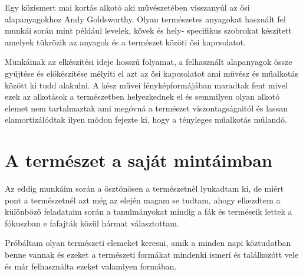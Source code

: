 \documentclass[fontsize=12pt, appendixprefix=true]{scrreprt}
\begin{document}
\vspace{3 mm}
Egy közismert mai kortás alkotó aki művészetében visszanyúl az ősi alapanyagokhoz Andy Goldsworthy. Olyan természetes anyagokat használt fel munkái során mint például levelek, kövek és hely- specifikus szobrokat készített amelyek tükrözik az anyagok és a természet közöti ősi kapcsolatot.

Munkáinak az elkészítési ideje hosszú folyamat, a felhasznált  alapanyagok össze gyűjtése és előkészítése mélyíti el azt az ősi kapcsolatot ami művész és műalkotás között ki tudd alakulni.
A kész művei fényképformájában maradtak fent mivel ezek az alkotások a természetben helyezkednek el és semmilyen olyan alkotó elemet nem tartalmaztak ami megóvná a természet viszontagságaitól és lassan elamortizálódtak ilyen módon fejezte ki, hogy a tényleges műalkotás múlandó.



\section{A természet a saját mintáimban}
Az eddig munkáim során a ösztönösen a természetnél lyukadtam ki, de miért pont a természetnél azt még az elején magam se tudtam, ahogy elkezdtem a különböző feladataim során a tanulmányokat mindig a fák és terméseik lettek a fókuszban e fafajták közül hármat választottam.

Próbáltam olyan természeti elemeket keresni, amik a minden napi köztudatban benne vannak és ezeket a természeti formákat mindenki ismeri és találkozótt vele és már felhasználta ezeket valamiyen formában. 
\end{document}
